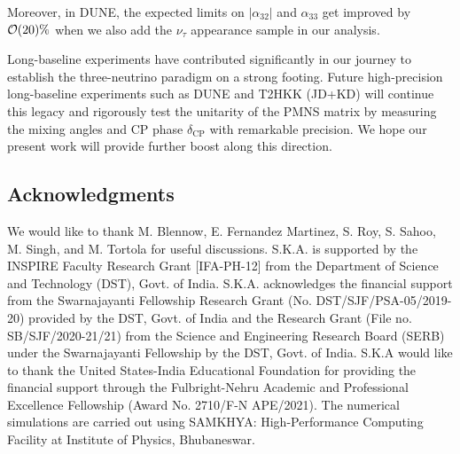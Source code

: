 \documentclass[11pt,a4paper]{article}
\begin{document}
Moreover, in DUNE, the expected limits on $|\alpha_{32}|$ and $\alpha_{33}$ get improved by ${\cal O}(20)\%$ when we also add the $\nu_{\tau}$ appearance sample in our analysis. 

Long-baseline experiments have contributed significantly in our journey to establish the three-neutrino paradigm on a strong footing. Future high-precision long-baseline experiments such as DUNE and T2HKK (JD+KD) will continue this legacy and rigorously test the unitarity of the PMNS matrix by measuring the mixing angles and CP phase $\delta_{\mathrm{CP}}$ with remarkable precision. We hope our present work will provide further boost along this direction.

\subsection*{Acknowledgments}
 We would like to thank M. Blennow, E. Fernandez Martinez, S. Roy, S. Sahoo, M. Singh, and M. Tortola for useful discussions.
 S.K.A. is supported by the INSPIRE
Faculty Research Grant [IFA-PH-12] from the Department
of Science and Technology (DST), Govt. of India.
S.K.A. acknowledges the financial support from the
Swarnajayanti Fellowship Research Grant
(No. DST/SJF/PSA-05/2019-20) provided by
the DST, Govt. of India and the Research Grant
(File no. SB/SJF/2020-21/21) from the Science
and Engineering Research Board (SERB) under
the Swarnajayanti Fellowship by the DST, Govt. of India. S.K.A would like to thank the United States-India Educational Foundation for providing the financial support through the Fulbright-Nehru Academic and Professional Excellence Fellowship (Award No. 2710/F-N APE/2021).
The numerical simulations are carried out using SAMKHYA: High-Performance Computing Facility at Institute of Physics, Bhubaneswar.
\end{document}
